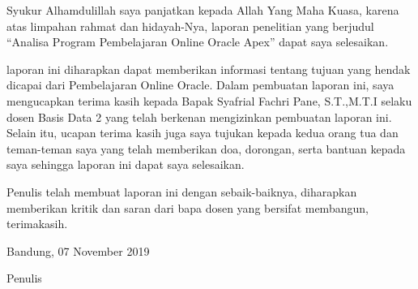\begin{acknowledgements}
Syukur Alhamdulillah saya panjatkan kepada Allah Yang Maha Kuasa, karena atas limpahan rahmat dan hidayah-Nya, laporan penelitian yang berjudul “Analisa Program Pembelajaran Online Oracle Apex” dapat saya selesaikan.

laporan ini diharapkan dapat memberikan informasi tentang tujuan yang hendak dicapai dari Pembelajaran Online Oracle. Dalam pembuatan laporan ini, saya mengucapkan terima kasih kepada Bapak Syafrial Fachri Pane, S.T.,M.T.I selaku dosen Basis Data 2 yang telah berkenan mengizinkan pembuatan laporan ini. Selain itu, ucapan terima kasih juga saya tujukan kepada kedua orang tua dan teman-teman saya yang telah memberikan doa, dorongan, serta bantuan kepada saya sehingga laporan ini dapat saya selesaikan.

Penulis telah membuat laporan ini dengan sebaik-baiknya, diharapkan memberikan kritik dan saran dari bapa dosen yang bersifat membangun, terimakasih.

\begin{raggedleft}

Bandung, 07 November 2019

Penulis

\end{raggedleft}

\end{acknowledgements}